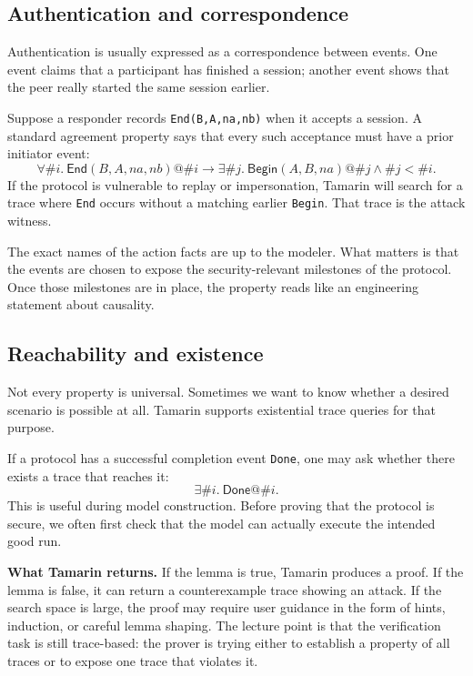 \subsection{Authentication and correspondence}

Authentication is usually expressed as a correspondence between events.
One event claims that a participant has finished a session; another event
shows that the peer really started the same session earlier.

\begin{example}
Suppose a responder records \texttt{End(B,A,na,nb)} when it accepts a
session.  A standard agreement property says that every such acceptance must
have a prior initiator event:
\[
  \forall \#i.\ \mathsf{End}(B,A,na,nb)@\#i \rightarrow
  \exists \#j.\ \mathsf{Begin}(A,B,na)@\#j \land \#j < \#i.
\]
If the protocol is vulnerable to replay or impersonation, Tamarin will search
for a trace where \texttt{End} occurs without a matching earlier
\texttt{Begin}.  That trace is the attack witness.
\end{example}

The exact names of the action facts are up to the modeler.  What matters is
that the events are chosen to expose the security-relevant milestones of the
protocol.  Once those milestones are in place, the property reads like an
engineering statement about causality.

\subsection{Reachability and existence}

Not every property is universal.  Sometimes we want to know whether a desired
scenario is possible at all.  Tamarin supports existential trace queries for
that purpose.

\begin{example}
If a protocol has a successful completion event \texttt{Done}, one may ask
whether there exists a trace that reaches it:
\[
  \exists \#i.\ \mathsf{Done}@\#i.
\]
This is useful during model construction.  Before proving that the protocol is
secure, we often first check that the model can actually execute the intended
good run.
\end{example}

\medskip\noindent
\textbf{What Tamarin returns.}  If the lemma is true, Tamarin produces a
proof.  If the lemma is false, it can return a counterexample trace showing an
attack.  If the search space is large, the proof may require user guidance in
the form of hints, induction, or careful lemma shaping.  The lecture point is
that the verification task is still trace-based: the prover is trying either
to establish a property of all traces or to expose one trace that violates it.

